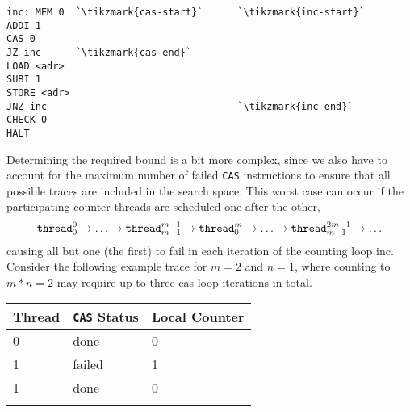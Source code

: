 \begin{minipage}{\textwidth}
\begin{lstlisting}[style=asm, caption={\CHANGE{Valid} counter template.}, label={lst:count:cas}, xleftmargin=0.39\textwidth]
inc: MEM 0  `\tikzmark{cas-start}`      `\tikzmark{inc-start}`
ADDI 1
CAS 0
JZ inc      `\tikzmark{cas-end}`
LOAD <adr>
SUBI 1
STORE <adr>
JNZ inc                                 `\tikzmark{inc-end}`
CHECK 0
HALT
\end{lstlisting}
\end{minipage}

Determining the required bound is a bit more complex, since we also have to account for the maximum number of failed \lstinline[style=asm]{CAS} instructions to ensure that all possible traces are included in the search space.
This worst case can occur if the participating counter threads are scheduled one after the other,
\[
  \texttt{thread}^0_0 \rightarrow \ldots \rightarrow \texttt{thread}^{m - 1}_{m - 1} \rightarrow \texttt{thread}^m_0 \rightarrow \ldots \rightarrow \texttt{thread}^{2m - 1}_{m - 1} \rightarrow \ldots
\]
causing all but one (the first) to fail in each iteration of the counting loop {\color{red!60!black}\textsf{inc}}.
Consider the following example trace
for $m = 2$ and $n = 1$,
where counting to $m * n = 2$ may require up to
three {\color{red!60!black}\textsf{cas}} loop iterations in total.
\begin{center}
  \begin{tabu}{lll}
    Thread & \lstinline[style=asm]{CAS} Status & Local Counter \\
     & done & 0 \\
    1 & failed & 1 \\
    \hline
     & done & 0 \\
    \lasthline
  \end{tabu}
\end{center}
